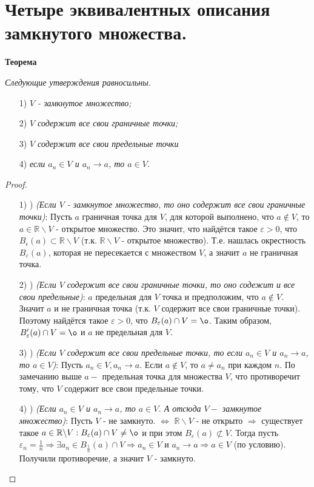 \documentclass[12pt]{article}
\begin{document}
\section{Четыре эквивалентных описания замкнутого множества.}

\textbf{Теорема}

\textit{Следующие утверждения равносильны.}

\begin{itemize}
    \item[1)] \textit{$V$ - замкнутое множество;}
    \item[2)] \textit{$V$ содержит все свои граничные точки;}
    \item[3)] \textit{$V$ содержит все свои предельные точки}
    \item[4)] \textit{если $a_n\in V$ и $a_n\rightarrow a$, то $a\in V$.}
\end{itemize}

\begin{proof}
 
\begin{itemize}
    \item[1) \Rightarrow2)]\textit{(Если $V$ - замкнутое множество, то оно содержит все свои граничные точки)}: \newline Пусть $a$ граничная точка для $V$, для которой выполнено, что $a\not\in V$, то $a\in\mathbb{R}\backslash V$ - открытое множество. Это значит, что найдётся такое $\varepsilon > 0$, что $B_\epsilon(a)\subset \mathbb{R}\backslash V$ (т.к. $\mathbb{R}\backslash V$ - открытое множество). Т.е. нашлась окрестность $B_\varepsilon(a)$, которая не пересекается с множеством $V$, а значит $a$ не граничная точка.
    \item[2) \Rightarrow3)] \textit{(Если $V$ содержит все свои граничные точки, то оно содежит и все свои предельные)}:  $a$ предельная для $V$ точка и предположим, что $a \not\in V$. Значит $a$ и не граничная точка (т.к. $V$ содержит все свои граничные точки). Поэтому найдётся такое $\varepsilon > 0$, что $B_\varepsilon(a)\cap V = \o$. Таким образом, $B'_\varepsilon(a)\cap V=\o$ и $a$ не предельная для $V$.
    \item[3) \Rightarrow4)] \textit{(Если $V$ содержит все свои предельные точки, то если $a_n\in V$ и $a_n\rightarrow a$, то $a\in V$)}: \newline Пусть $a_n\in V, a_n\rightarrow a$. Если $a\not\in V$, то $a\neq a_n$ при каждом $n$. По замечанию выше $a - $ предельная точка для множества $V$, что противоречит тому, что $V$ содержит все свои предельные точки.
    \item[4) \Rightarrow1)] \textit{(Если $a_n\in V$ и $a_n\rightarrow a$, то $a\in V$. А отсюда $V - $ замкнутое множество)}: \newline Пусть $V$ - не замкнуто. $\Leftrightarrow$ $\mathbb{R}\backslash V$ - не открыто $\Rightarrow$ существует такое $a\in \mathbb{R}\backslash V: B_\varepsilon(a) \cap V \neq \o$ и при этом $B_\varepsilon(a)\not\subset V$. Тогда пусть $\varepsilon_n = \frac{1}{n} \Rightarrow \exists a_n\in B_{\frac{1}{n}}(a) \cap V \Rightarrow a_n\in V$ и $a_n\rightarrow a \Rightarrow a\in V$ (по условию). Получили противоречие, а значит $V$ - замкнуто.
\end{itemize}
\end{proof}
\end{document}
